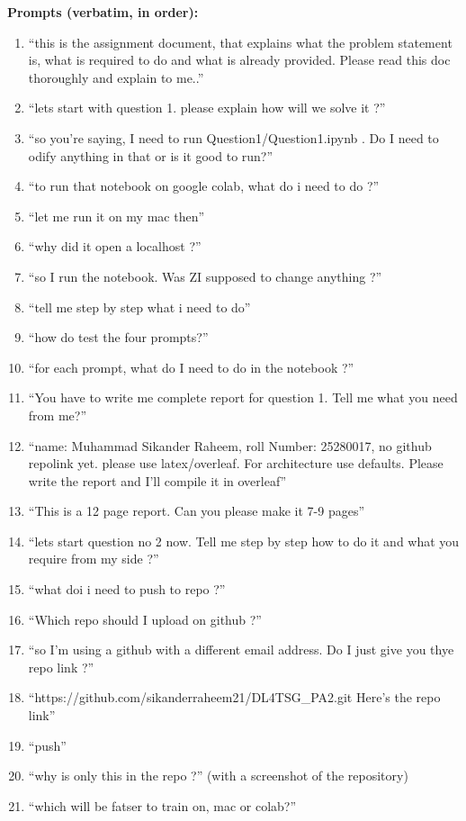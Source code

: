 \documentclass[11pt,a4paper]{article}
\begin{document}
{\textbf{Prompts (verbatim, in order):}
\begin{enumerate}[leftmargin=*,itemsep=0pt]
  \item ``this is the assignment document, that explains what the problem statement is, what is required to do and what is already provided. Please read this doc thoroughly and explain to me..''
  \item ``lets start with question 1. please explain how will we solve it ?''
  \item ``so you're saying, I need to run Question1/Question1.ipynb . Do I need to odify anything in that or is it good to run?''
  \item ``to run that notebook on google colab, what do i need to do ?''
  \item ``let me run it on my mac then''
  \item ``why did it open a localhost ?''
  \item ``so I run the notebook. Was ZI supposed to change anything ?''
  \item ``tell me step by step what i need to do''
  \item ``how do test the four prompts?''
  \item ``for each prompt, what do I need to do in the notebook ?''
  \item ``You have to write me complete report for question 1. Tell me what you need from me?''
  \item ``name: Muhammad Sikander Raheem, roll Number: 25280017, no github repolink yet. please use latex/overleaf. For architecture use defaults. Please write the report and I'll compile it in overleaf''
  \item ``This is a 12 page report. Can you please make it 7-9 pages''
  \item ``lets start question no 2 now. Tell me step by step how to do it and what you require from my side ?''
  \item ``what doi i need to push to repo ?''
  \item ``Which repo should I upload on github ?''
  \item ``so I'm using a github with a different email address. Do I just give you thye repo link ?''
  \item ``https://github.com/sikanderraheem21/DL4TSG\_PA2.git Here's the repo link''
  \item ``push''
  \item ``why is only this in the repo ?'' (with a screenshot of the repository)
  \item ``which will be fatser to train on, mac or colab?''

\end{enumerate}}
\end{document}
